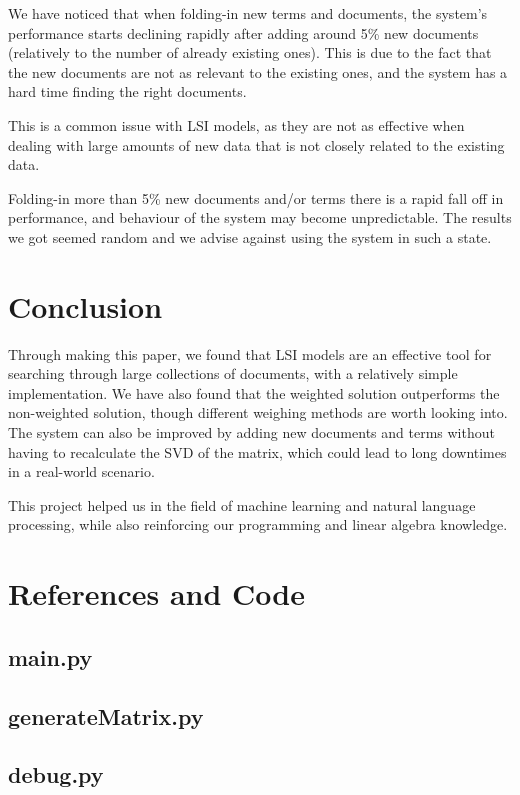 \documentclass[12pt,a4paper]{article}
\begin{document}
\noindent We have noticed that when folding-in new terms and documents, the system's performance starts declining rapidly after adding around 5\% new documents (relatively to the number of already existing ones). This is due to the fact that the new documents are not as relevant to the existing ones, and the system has a hard time finding the right documents. 

\bigskip
\noindent This is a common issue with LSI models, as they are not as effective when dealing with large amounts of new data that is not closely related to the existing data.

\bigskip
\noindent Folding-in more than 5\% new documents and/or terms there is a rapid fall off in performance, and behaviour of the system may become unpredictable. The results we got seemed random and we advise against using the system in such a state.
\newpage
\section{Conclusion}
Through making this paper, we found that LSI models are an effective tool for searching through large collections of documents, with a relatively simple implementation. We have also found that the weighted solution outperforms the non-weighted solution, though different weighing methods are worth looking into. The system can also be improved by adding new documents and terms without having to recalculate the SVD of the matrix, which could lead to long downtimes in a real-world scenario.

\bigskip
\noindent
This project helped us in the field of machine learning and natural language processing, while also reinforcing our programming and linear algebra knowledge.

\newpage
\section{References and Code}

\subsection{main.py}

\newpage
\subsection{generateMatrix.py}

\newpage
\subsection{debug.py}


\end{document}
